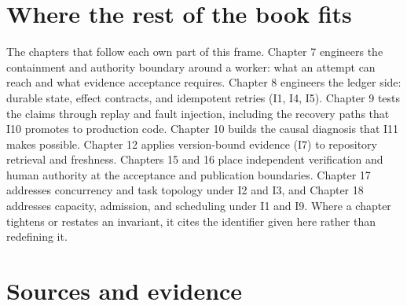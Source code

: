 \hypertarget{where-the-rest-of-the-book-fits}{%
\section*{Where the rest of the book fits}\label{where-the-rest-of-the-book-fits}}

The chapters that follow each own part of this frame. Chapter 7 engineers the containment and authority boundary around a worker: what an attempt can reach and what evidence acceptance requires. Chapter 8 engineers the ledger side: durable state, effect contracts, and idempotent retries (I1, I4, I5). Chapter 9 tests the claims through replay and fault injection, including the recovery paths that I10 promotes to production code. Chapter 10 builds the causal diagnosis that I11 makes possible. Chapter 12 applies version-bound evidence (I7) to repository retrieval and freshness. Chapters 15 and 16 place independent verification and human authority at the acceptance and publication boundaries. Chapter 17 addresses concurrency and task topology under I2 and I3, and Chapter 18 addresses capacity, admission, and scheduling under I1 and I9. Where a chapter tightens or restates an invariant, it cites the identifier given here rather than redefining it.

\hypertarget{sources-and-evidence}{%
\section*{Sources and evidence}\label{sources-and-evidence}}


